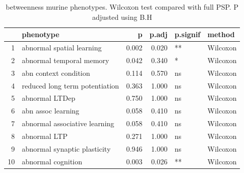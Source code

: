 \begin{table}[ht]
\centering
\begin{tabular}{rlrrll}
  \toprule
 & phenotype & p & p.adj & p.signif & method \\ 
  \midrule
1 & abnormal spatial learning & 0.002 & 0.020 & ** & Wilcoxon \\ 
  2 & abnormal temporal memory & 0.042 & 0.340 & * & Wilcoxon \\ 
  3 & abn context condition & 0.114 & 0.570 & ns & Wilcoxon \\ 
  4 & reduced long term potentiation & 0.363 & 1.000 & ns & Wilcoxon \\ 
  5 & abnormal LTDep & 0.750 & 1.000 & ns & Wilcoxon \\ 
  6 & abn assoc learning & 0.058 & 0.410 & ns & Wilcoxon \\ 
  7 & abnormal associative learning & 0.058 & 0.410 & ns & Wilcoxon \\ 
  8 & abnormal LTP & 0.271 & 1.000 & ns & Wilcoxon \\ 
  9 & abnormal synaptic plasticity & 0.946 & 1.000 & ns & Wilcoxon \\ 
  10 & abnormal cognition & 0.003 & 0.026 & ** & Wilcoxon \\ 
   \bottomrule
\end{tabular}
\caption{betweenness murine phenotypes. Wilcoxon test compared with full PSP. P adjusted using B.H} 
\label{tab:betweenness murine phenotypes. Wilcoxon test compared with full PSP. P adjusted using B.H}
\end{table}


